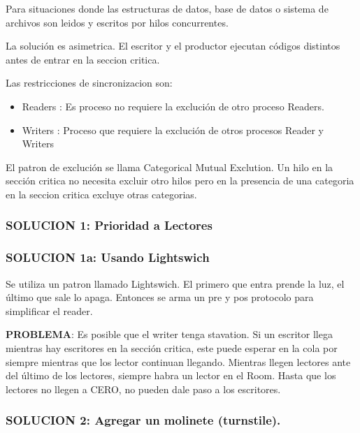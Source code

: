 \documentclass{article}
\begin{document}
Para situaciones donde las estructuras de datos, base de datos o sistema de archivos son leidos y escritos por hilos concurrentes.

La solución es asimetrica. El escritor y el productor ejecutan códigos distintos antes de entrar en la seccion critica.

Las restricciones de sincronizacion son:
\begin{itemize}
    \item Readers : Es proceso no requiere la exclución de otro proceso Readers.
    \item Writers : Proceso que requiere la exclución de otros procesos Reader y Writers
\end{itemize}

El patron de exclución se llama Categorical Mutual Exclution.
Un hilo en la sección critica no necesita excluir otro hilos pero en la presencia de una categoria en la seccion critica excluye otras categorias.

\subsubsection{SOLUCION 1: Prioridad a Lectores}



\newpage
\subsubsection{SOLUCION 1a: Usando Lightswich}
Se utiliza un patron llamado Lightswich. El primero que entra prende la luz, el último que sale lo apaga. Entonces se arma un pre y pos protocolo para simplificar el reader.



\textbf{PROBLEMA}: Es posible que el writer tenga stavation.
Si un escritor llega mientras hay escritores en la sección critica, este puede esperar en la cola por siempre mientras que los lector continuan llegando. 
Mientras llegen lectores ante del último de los lectores, siempre habra un lector en el Room. Hasta que los lectores no llegen a CERO, no pueden dale paso a los escritores.

\newpage
\subsubsection{SOLUCION 2: Agregar un molinete (turnstile).}
\end{document}
